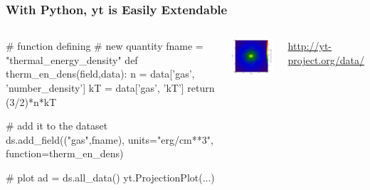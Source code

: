\documentclass[]{beamer}
\begin{document}
\begin{frame}[fragile]
  \frametitle{With Python, yt is Easily Extendable}
  \begin{columns}
    \column{7cm}
\begin{python}
# function defining 
# new quantity
fname = "thermal_energy_density"
def therm_en_dens(field,data):
    n = data['gas', 
             'number_density']
    kT = data['gas', 'kT']
    return (3/2)*n*kT

# add it to the dataset
ds.add_field(("gas",fname), 
             units="erg/cm**3", 
        function=therm_en_dens)

# plot
ad = ds.all_data()
yt.ProjectionPlot(...)
\end{python}
    \column{5cm}
    \begin{center}
      \includegraphics[width=6cm]{figures/isolated_galaxy_thermal_energy_density.pdf}
    \end{center}
    \begin{flushright}
      {\footnotesize\url{http://yt-project.org/data/}}
    \end{flushright}
  \end{columns}
\end{frame}
\end{document}
